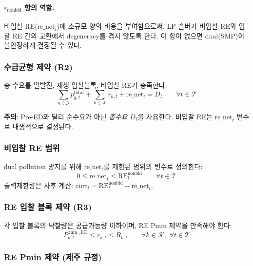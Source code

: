 \documentclass[11pt, a4paper]{article}
\begin{document}
\paragraph{$\varepsilon_{\text{nonbid}}$ 항의 역할.}
비입찰 RE($\text{re\_net}_t$)에 소규모 양의 비용을 부여함으로써,
LP 솔버가 비입찰 RE와 입찰 RE 간의 교환에서 degeneracy를 겪지 않도록 한다.
이 항이 없으면 dual(SMP)이 불안정하게 결정될 수 있다.

\subsubsection{수급균형 제약 (R2)}

총 수요를 열발전, 재생 입찰블록, 비입찰 RE가 충족한다:
\begin{equation}\label{eq:post_balance}
    \boxed{\sum_{g \in \mathcal{G}} p_{g,t}^{\text{total}} + \sum_{k \in \mathcal{K}} r_{k,t} + \text{re\_net}_t = D_t \qquad \forall t \in \mathcal{T}}
\end{equation}

\textbf{주의}: Pre-ED와 달리 순수요가 아닌 \emph{총수요} $D_t$를 사용한다.
비입찰 RE는 $\text{re\_net}_t$ 변수로 내생적으로 결정된다.

\subsubsection{비입찰 RE 범위}

dual pollution 방지를 위해 $\text{re\_net}_t$를 제한된 범위의 변수로 정의한다:
\begin{equation}\label{eq:re_net_bound}
    0 \leq \text{re\_net}_t \leq \text{RE}_t^{\text{nonbid}} \qquad \forall t \in \mathcal{T}
\end{equation}
출력제한량은 사후 계산: $\text{curt}_t = \text{RE}_t^{\text{nonbid}} - \text{re\_net}_t$.

\subsubsection{RE 입찰 블록 제약 (R3)}

각 입찰 블록의 낙찰량은 공급가능량 이하이며, RE Pmin 제약을 만족해야 한다:
\begin{equation}\label{eq:re_bounds}
    P_{k,t}^{\min,\text{RE}} \leq r_{k,t} \leq \bar{R}_{k,t} \qquad \forall k \in \mathcal{K}, \; \forall t \in \mathcal{T}
\end{equation}

\subsubsection{RE Pmin 제약 (제주 규정)}
\end{document}
